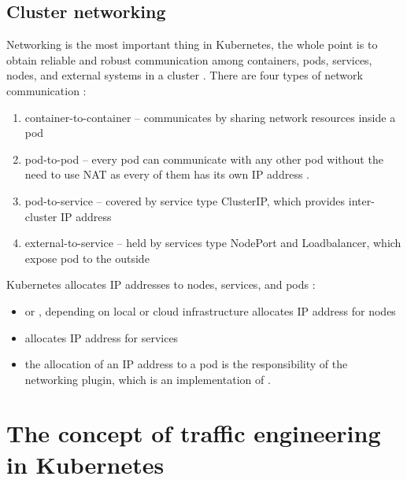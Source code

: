 


\subsection{Cluster networking}
\label{sec:k8s_networking}

Networking is the most important thing in Kubernetes, the whole point is to obtain reliable and robust communication among containers, pods, services, nodes, and external systems in a cluster \cite{KubernetesDocs}. There are four types of network communication \cite{KubernetesDocs}:

\begin{enumerate}
    \item container-to-container -- communicates by sharing network resources inside a pod
    \item pod-to-pod -- every pod can communicate with any other pod without the need to use NAT as every of them has its own IP address \cite{IBMKubernetesNetworking}.
    \item pod-to-service -- covered by service type ClusterIP, which provides inter-cluster IP address
    \item external-to-service -- held by services type NodePort and Loadbalancer, which expose pod to the outside
\end{enumerate}
Kubernetes allocates IP addresses to nodes, services, and pods \cite{KubernetesDocs}:
\begin{itemize}
    \item \textit{} or \textit{}, depending on local or cloud infrastructure allocates IP address for nodes
    \item \textit{} allocates IP address for services
    \item the allocation of an IP address to a pod is the responsibility of the networking plugin, which is an implementation of \textit{}.
\end{itemize}



\section{The concept of traffic engineering in Kubernetes}
\label{sec:trafficConcept}


